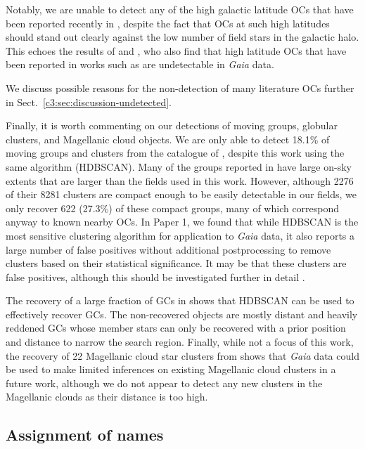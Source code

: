 Notably, we are unable to detect any of the high galactic latitude OCs that have been reported recently in \cite{li_lisc_2023}, despite the fact that OCs at such high latitudes should stand out clearly against the low number of field stars in the galactic halo. This echoes the results of \cite{cantat-gaudin_characterising_2018} and \cite{cantat-gaudin_clusters_2020}, who also find that high latitude OCs that have been reported in works such as \cite{schmeja_global_2014} are undetectable in \emph{Gaia} data.

We discuss possible reasons for the non-detection of many literature OCs further in Sect.~\ref{c3:sec:discussion-undetected}.

Finally, it is worth commenting on our detections of moving groups, globular clusters, and Magellanic cloud objects. We are only able to detect 18.1\% of moving groups and clusters from the catalogue of \cite{kounkel_untangling_2020}, despite this work using the same algorithm (HDBSCAN). Many of the groups reported in \cite{kounkel_untangling_2020} have large on-sky extents that are larger than the fields used in this work. However, although 2276 of their 8281 clusters are compact enough to be easily detectable in our fields, we only recover 622 (27.3\%) of these compact groups, many of which correspond anyway to known nearby OCs. In Paper 1, we found that while HDBSCAN is the most sensitive clustering algorithm for application to \emph{Gaia} data, it also reports a large number of false positives without additional postprocessing to remove clusters based on their statistical significance. It may be that these clusters are false positives, although this should be investigated further in detail \citep[see e.g.][]{zucker_disconnecting_dots_2022}.

The recovery of a large fraction of GCs in \cite{vasiliev_gaia_2021} shows that HDBSCAN can be used to effectively recover GCs. The non-recovered objects are mostly distant and heavily reddened GCs whose member stars can only be recovered with a prior position and distance to narrow the search region. Finally, while not a focus of this work, the recovery of 22 Magellanic cloud star clusters from \cite{bica_general_2008} shows that \emph{Gaia} data could be used to make limited inferences on existing Magellanic cloud clusters in a future work, although we do not appear to detect any new clusters in the Magellanic clouds as their distance is too high. 

\subsection{Assignment of names}\label{c3:sec:crossmatching:names}

